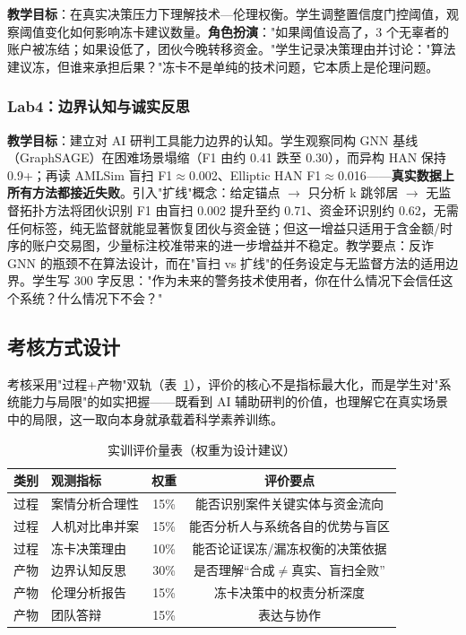 \documentclass[12pt,a4paper]{ctexart}
\begin{document}
\textbf{教学目标}：在真实决策压力下理解技术—伦理权衡。学生调整置信度门控阈值，观察阈值变化如何影响冻卡建议数量。\textbf{角色扮演}："如果阈值设高了，3 个无辜者的账户被冻结；如果设低了，团伙今晚转移资金。"学生记录决策理由并讨论："算法建议冻，但谁来承担后果？"冻卡不是单纯的技术问题，它本质上是伦理问题。

\subsubsection{Lab4：边界认知与诚实反思}
\label{sec:lab4}

\textbf{教学目标}：建立对 AI 研判工具能力边界的认知。学生观察同构 GNN 基线（GraphSAGE）在困难场景塌缩（F1 由约 0.41 跌至 0.30），而异构 HAN 保持 0.9+；再读 AMLSim 盲扫 F1$\approx$0.002、Elliptic HAN F1$\approx$0.016——\textbf{真实数据上所有方法都接近失败}。引入"扩线"概念：给定锚点 $\to$ 只分析 k 跳邻居 $\to$ 无监督拓扑方法将团伙识别 F1 由盲扫 0.002 提升至约 0.71、资金环识别约 0.62，无需任何标签，纯无监督就能显著恢复团伙与资金链；但这一增益只适用于含金额/时序的账户交易图，少量标注校准带来的进一步增益并不稳定。教学要点：反诈 GNN 的瓶颈不在算法设计，而在"盲扫 vs 扩线"的任务设定与无监督方法的适用边界。学生写 300 字反思："作为未来的警务技术使用者，你在什么情况下会信任这个系统？什么情况下不会？"

\subsection{考核方式设计}

考核采用"过程+产物"双轨（表~\ref{tab:rubric}），评价的核心不是指标最大化，而是学生对"系统能力与局限"的如实把握——既看到 AI 辅助研判的价值，也理解它在真实场景中的局限，这一取向本身就承载着科学素养训练。

\begin{table}[htbp]
  \centering
  \caption{实训评价量表（权重为设计建议）}
  \label{tab:rubric}
  \begin{tabular}{lp{4.8cm}cc}
    \toprule
    类别 & 观测指标 & 权重 & 评价要点 \\
    \midrule
    过程 & 案情分析合理性 & 15\% & 能否识别案件关键实体与资金流向 \\
    过程 & 人机对比串并案 & 15\% & 能否分析人与系统各自的优势与盲区 \\
    过程 & 冻卡决策理由 & 10\% & 能否论证误冻/漏冻权衡的决策依据 \\
    产物 & 边界认知反思 & 30\% & 是否理解“合成$\neq$真实、盲扫全败” \\
    产物 & 伦理分析报告 & 15\% & 冻卡决策中的权责分析深度 \\
    产物 & 团队答辩 & 15\% & 表达与协作 \\
    \bottomrule
  \end{tabular}
\end{table}
\end{document}
